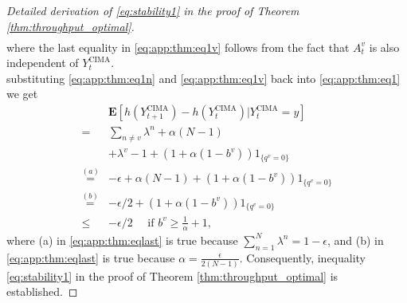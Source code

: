 \documentclass[onecolumn,draftcls]{IEEEtran}
\newcommand{\g}{\text{CIMA}}
\begin{document}
\begin{proof}[Detailed derivation of \eqref{eq:stability1} in the proof of Theorem \ref{thm:throughput_optimal}]
\begin{align}
\label{eq:app:thm:eq1v}
\end{align}
where the last equality in \eqref{eq:app:thm:eq1v} follows from the fact that $A^v_t$ is also independent of $Y^{\g}_t$.
\\
substituting \eqref{eq:app:thm:eq1n} and \eqref{eq:app:thm:eq1v} back into \eqref{eq:app:thm:eq1} we get
\begin{align}
 & \mathbf{E}\left[h(Y^{\g}_{t+1}) - h(Y^{\g}_t) | Y^{\g}_t=y\right] \nonumber\\
= &\sum_{n \neq v} \lambda^n +\alpha(N-1) \nonumber\\
&+ \lambda^v - 1 + (1 + \alpha(1-b^v))   1_{\{q^v=0\}}\nonumber\\
\stackrel{(a)}{=}  &-\epsilon +\alpha(N-1)
+ (1+\alpha(1-b^v))1_{\{q^v=0\}} \nonumber\\
\stackrel{(b)}{=}  &-\epsilon/2
+ (1+\alpha(1-b^v))1_{\{q^v=0\}} \nonumber\\
\leq & -\epsilon/2 \quad \text{   if } b^v \geq \frac{1}{\alpha}+1,
\label{eq:app:thm:eqlast}
\end{align}
where (a) in \eqref{eq:app:thm:eqlast} is true because $\sum_{n=1}^N \lambda^n = 1-\epsilon$, and (b) in \eqref{eq:app:thm:eqlast} is true because $\alpha = \frac{\epsilon}{2(N-1)}$.
Consequently, inequality \eqref{eq:stability1} in the proof of Theorem \ref{thm:throughput_optimal} is established.
\end{proof}
\end{document}
